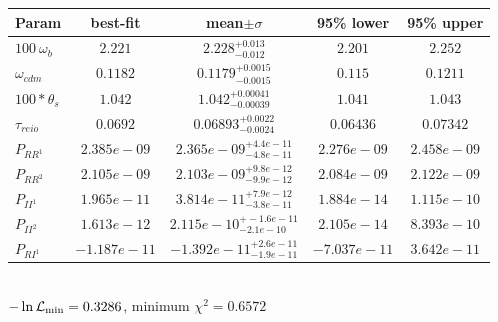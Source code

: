 \begin{tabular}{|l|c|c|c|c|} 
 \hline 
Param & best-fit & mean$\pm\sigma$ & 95\% lower & 95\% upper \\ \hline 
$100~\omega_{b }$ &$2.221$ & $2.228_{-0.012}^{+0.013}$ & $2.201$ & $2.252$ \\ 
$\omega_{cdm }$ &$0.1182$ & $0.1179_{-0.0015}^{+0.0015}$ & $0.115$ & $0.1211$ \\ 
$100*\theta_{s }$ &$1.042$ & $1.042_{-0.00039}^{+0.00041}$ & $1.041$ & $1.043$ \\ 
$\tau_{reio }$ &$0.0692$ & $0.06893_{-0.0024}^{+0.0022}$ & $0.06436$ & $0.07342$ \\ 
$P_{{RR}^1 }$ &$2.385e-09$ & $2.365e-09_{-4.8e-11}^{+4.4e-11}$ & $2.276e-09$ & $2.458e-09$ \\ 
$P_{{RR}^2 }$ &$2.105e-09$ & $2.103e-09_{-9.9e-12}^{+9.8e-12}$ & $2.084e-09$ & $2.122e-09$ \\ 
$P_{{II}^1 }$ &$1.965e-11$ & $3.814e-11_{-3.8e-11}^{+7.9e-12}$ & $1.884e-14$ & $1.115e-10$ \\ 
$P_{{II}^2 }$ &$1.613e-12$ & $2.115e-10_{-2.1e-10}^{+-1.6e-11}$ & $2.105e-14$ & $8.393e-10$ \\ 
$P_{{RI}^1 }$ &$-1.187e-11$ & $-1.392e-11_{-1.9e-11}^{+2.6e-11}$ & $-7.037e-11$ & $3.642e-11$ \\ 
\hline 
 \end{tabular} \\ 
$-\ln{\cal L}_\mathrm{min} =0.3286$, minimum $\chi^2=0.6572$ \\ 
